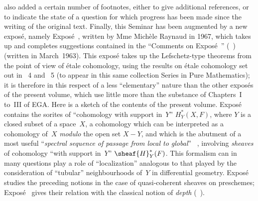 also added a certain number of footnotes, either to give additional
references, or to indicate the state of a question for which progress has
been made since the writing of the original text. Finally, this Seminar
has been augmented by a new expos\'e, namely Expos\'e~, written
by Mme Mich\`ele Raynaud in 1967, which takes up and completes suggestions
contained in the ``Comments on Expos\'e~''
(~) (written in March~1963). This expos\'e takes up
the Lefschetz-type theorems from the point of view of \'etale cohomology,
using the results on \'etale cohomology set out in \SGA~4 and \SGA~5 (to
appear in this same collection Series in Pure Mathematics); it is therefore in this respect of a less
``elementary'' nature than the other expos\'es of the present volume,
which use little more than the substance of Chapters~I to~III of EGA.
Here is a sketch of the contents of the present volume. Expos\'e~
contains the sorites of ``cohomology with support in~$Y$''
$H^*_Y(X, F)$, where $Y$ is a closed subset of a space~$X$, a cohomology
which can be interpreted as a cohomology of~$X$ \emph{modulo} the open
set $X-Y$, and which is the abutment of a most useful ``\emph{spectral
sequence of passage from local to global}'' ~,
involving \emph{sheaves} of cohomology ``with support in~$Y$''
$\sheaf{H}^*_Y(F)$. This formalism can in many questions play a role of
``localization'' analogous to that played by the consideration of
``tubular'' neighbourhoods of~$Y$ in differential geometry.
Expos\'e~ studies the preceding notions in the case of
quasi-coherent sheaves on preschemes; Expos\'e~ gives their
relation with the classical notion of \emph{depth}
(~).

